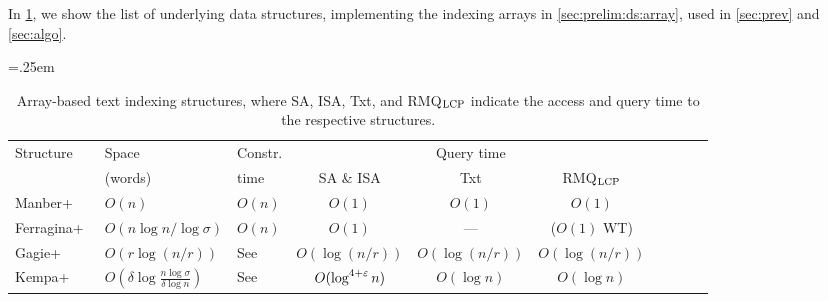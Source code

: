 


\begin{toappendix}
In \cref{table:arrays:hybrid}, we show the list of underlying data structures, implementing the indexing arrays in \cref{sec:prelim:ds:array}, used in \cref{sec:prev} and \cref{sec:algo}. 
\begin{table}[h]\centering\tabcolsep=.25em
\caption{%
  Array-based text indexing structures, where SA, ISA, Txt, and RMQ$_{\mathrm{LCP}}$ indicate the access and query time to the respective structures.
}\label{table:arrays:hybrid}
\medskip
\begin{tabular}{l>{\centering}p{7em}>{\centering}p{4em}cccclll}\toprule
  Structure  & Space & Constr. & \multicolumn{3}{c}{Query time}	\\
\cmidrule{4-6}
& (words) & time  & SA \& ISA	& Txt	& RMQ$_{\mathrm{LCP}}$
\\
  \midrule
Manber+~\cite{manber:myers1993suffixarrays}	& $O(n)$   & $O(n)$	& $O(1)$	& $O(1)$	& $O(1)$	\\
Ferragina+~\cite{Ferragina05:FM}  & $O(n\log n/\log\sigma)$	& $O(n)$  & $O(1)$	& ---	& ($O(1)$ WT)	\\
Gagie+~\cite{gagie:navarro:prezza2020fully}	& $O(r\log(n/r))$	& See~\cite{gagie:navarro:prezza2020fully}   & $O(\log(n/r))$	& $O(\log(n/r))$	& $O(\log(n/r))$	\\
Kempa+~\cite{kempa:kociumaka2023collapsing}	& $O(\delta \log\frac{n\log\sigma}{\delta\log n})$	& See~\cite{kempa:kociumaka2023collapsing}   & $O(\log^{4+\varepsilon} n)$	& $O(\log n)$	& $O(\log n)$	\\
\bottomrule
\end{tabular}
\end{table}
\end{toappendix}

